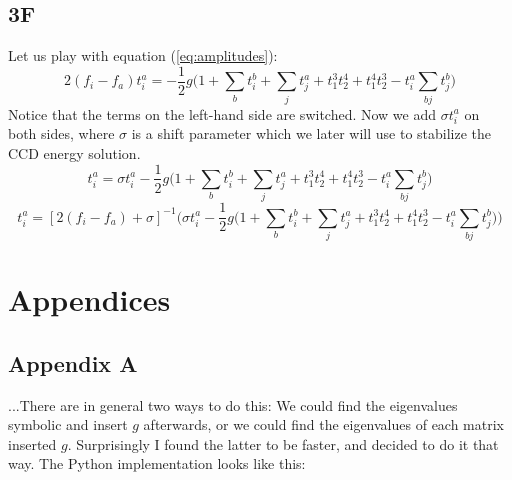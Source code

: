\documentclass[norsk,a4paper,12pt]{article}
\begin{document}
\subsection*{3F}
Let us play with equation (\ref{eq:amplitudes}):
\begin{equation}
2(f_i-f_a)t_i^a=-\frac{1}{2}g\bigg(1+\sum_bt_i^b+\sum_jt_j^a+t_1^3t_2^4+t_1^4t_2^3-t_i^a\sum_{bj}t_j^b\bigg)
\end{equation}
Notice that the terms on the left-hand side are switched. Now we add $\sigma t_i^a$ on both sides, where $\sigma$ is a shift parameter which we later will use to stabilize the CCD energy solution.
\begin{equation}
[2(f_i-f_a)+\sigma]t_i^a=\sigma t_i^a-\frac{1}{2}g\Big(1+\sum_bt_i^b+\sum_jt_j^a+t_1^3t_2^4+t_1^4t_2^3-t_i^a\sum_{bj}t_j^b\Big)
\end{equation}
\begin{equation}
t_i^a=[2(f_i-f_a)+\sigma]^{-1}\bigg(\sigma t_i^a-\frac{1}{2}g\Big(1+\sum_bt_i^b+\sum_jt_j^a+t_1^3t_2^4+t_1^4t_2^3-t_i^a\sum_{bj}t_j^b\Big)\bigg)
\end{equation}

\section{Appendices}
\subsection*{Appendix A}
...There are in general two ways to do this: We could find the eigenvalues symbolic and insert $g$ afterwards, or we could find the eigenvalues of each matrix inserted $g$. Surprisingly I found the latter to be faster, and decided to do it that way. The Python implementation looks like this:

\end{document}
